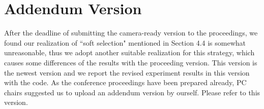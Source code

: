 \documentclass[runningheads]{llncs}
\begin{document}
\section*{Addendum Version}
After the deadline of submitting the camera-ready version to the proceedings, we found our realization of ``soft selection" mentioned in Section 4.4 is somewhat unreasonable, thus we adopt another suitable realization for this strategy, which causes some differences of the results with the proceeding version. This version is the newest version and we report the revised experiment results in this version with the code. As the conference proceedings have been prepared already, PC chairs suggested us to upload an addendum version by ourself. Please refer to this version.
\end{document}

